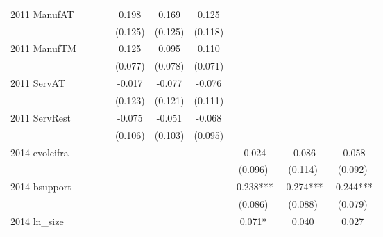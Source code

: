 \begin{table}[htbp]
\begin{tabular}{l*{9}{c}}
2011 ManufAT        &               &               &               &       0.198   &       0.169   &       0.125   &               &               &               \\
                    &               &               &               &     (0.125)   &     (0.125)   &     (0.118)   &               &               &               \\
2011 ManufTM        &               &               &               &       0.125   &       0.095   &       0.110   &               &               &               \\
                    &               &               &               &     (0.077)   &     (0.078)   &     (0.071)   &               &               &               \\
2011 ServAT         &               &               &               &      -0.017   &      -0.077   &      -0.076   &               &               &               \\
                    &               &               &               &     (0.123)   &     (0.121)   &     (0.111)   &               &               &               \\
2011 ServRest       &               &               &               &      -0.075   &      -0.051   &      -0.068   &               &               &               \\
                    &               &               &               &     (0.106)   &     (0.103)   &     (0.095)   &               &               &               \\
2014 evolcifra      &               &               &               &               &               &               &      -0.024   &      -0.086   &      -0.058   \\
                    &               &               &               &               &               &               &     (0.096)   &     (0.114)   &     (0.092)   \\
2014 bsupport       &               &               &               &               &               &               &      -0.238***&      -0.274***&      -0.244***\\
                    &               &               &               &               &               &               &     (0.086)   &     (0.088)   &     (0.079)   \\
2014 ln\_size        &               &               &               &               &               &               &       0.071*  &       0.040   &       0.027   \\

\end{tabular}
\end{table}
